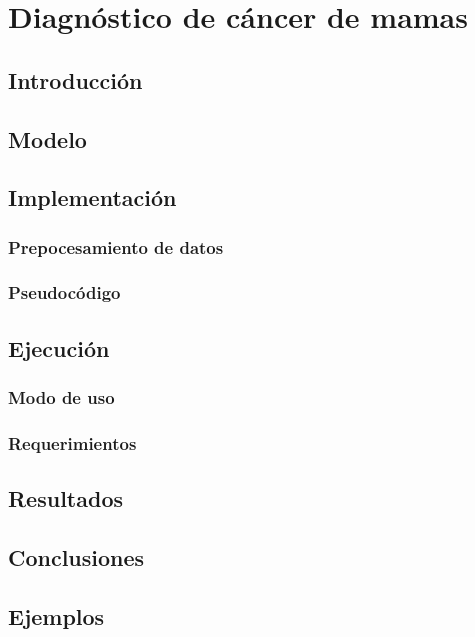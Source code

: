 \section{Diagnóstico de cáncer de mamas}

\subsection{Introducción}

\subsection{Modelo}

\subsection{Implementación}

\subsubsection{Prepocesamiento de datos}

\subsubsection{Pseudocódigo}

\subsection{Ejecución}

\subsubsection{Modo de uso}

\subsubsection{Requerimientos}

\subsection{Resultados}

\subsection{Conclusiones}

\subsection{Ejemplos}

